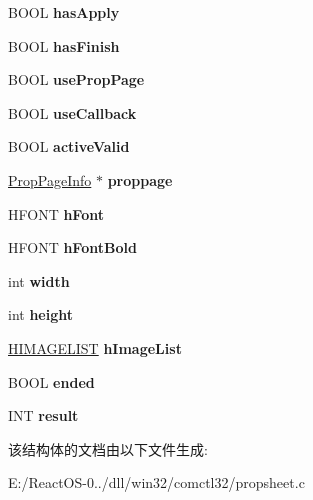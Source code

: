 \begin{DoxyCompactItemize}
B\+O\+OL {\bfseries has\+Apply}
\item 
\mbox{\label{structtag_prop_sheet_info_abd9ab323778f9ffba9bd19607f0b820a}} 
B\+O\+OL {\bfseries has\+Finish}
\item 
\mbox{\label{structtag_prop_sheet_info_ad215c72ea15dcfd856f089b767d495b9}} 
B\+O\+OL {\bfseries use\+Prop\+Page}
\item 
\mbox{\label{structtag_prop_sheet_info_a95f15368ddfc65dc864317eafa800bcc}} 
B\+O\+OL {\bfseries use\+Callback}
\item 
\mbox{\label{structtag_prop_sheet_info_af244d7c957f9735b4e1923a6a41b48ae}} 
B\+O\+OL {\bfseries active\+Valid}
\item 
\mbox{\label{structtag_prop_sheet_info_a93031c92006ef3131a23dd348e260b20}} 
\hyperlink{structtag_prop_page_info}{Prop\+Page\+Info} $\ast$ {\bfseries proppage}
\item 
\mbox{\label{structtag_prop_sheet_info_a0a4a0c69d8d159fc3449dfbd81973be3}} 
H\+F\+O\+NT {\bfseries h\+Font}
\item 
\mbox{\label{structtag_prop_sheet_info_a52fe65c52de80d4f23a12ebe929a05b3}} 
H\+F\+O\+NT {\bfseries h\+Font\+Bold}
\item 
\mbox{\label{structtag_prop_sheet_info_a3496a141fe9be3c86c9b8c13b0d13910}} 
int {\bfseries width}
\item 
\mbox{\label{structtag_prop_sheet_info_a4889da3b2b9bf0c1cf3428f40001651f}} 
int {\bfseries height}
\item 
\mbox{\label{structtag_prop_sheet_info_a4bd9487febbdb3c0cfa4a092aa94df72}} 
\hyperlink{struct___i_m_a_g_e_l_i_s_t}{H\+I\+M\+A\+G\+E\+L\+I\+ST} {\bfseries h\+Image\+List}
\item 
\mbox{\label{structtag_prop_sheet_info_a3ce7e54fbeef6c4f4b9dc87f99f14e6f}} 
B\+O\+OL {\bfseries ended}
\item 
\mbox{\label{structtag_prop_sheet_info_ae86113cb97062f2b0c8c7f533ad5d58e}} 
I\+NT {\bfseries result}
\end{DoxyCompactItemize}


该结构体的文档由以下文件生成\+:\begin{DoxyCompactItemize}
\item 
E\+:/\+React\+O\+S-\/0../dll/win32/comctl32/propsheet.\+c\end{DoxyCompactItemize}

